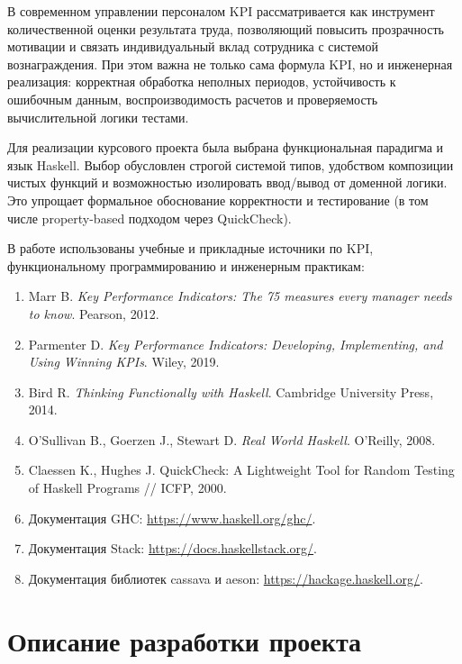 \documentclass[a4paper,14pt]{extarticle}
\begin{document}
В современном управлении персоналом KPI рассматривается как инструмент количественной оценки результата труда, позволяющий повысить прозрачность мотивации и связать индивидуальный вклад сотрудника с системой вознаграждения. При этом важна не только сама формула KPI, но и инженерная реализация: корректная обработка неполных периодов, устойчивость к ошибочным данным, воспроизводимость расчетов и проверяемость вычислительной логики тестами.

Для реализации курсового проекта была выбрана функциональная парадигма и язык Haskell. Выбор обусловлен строгой системой типов, удобством композиции чистых функций и возможностью изолировать ввод/вывод от доменной логики. Это упрощает формальное обоснование корректности и тестирование (в том числе property-based подходом через QuickCheck).

В работе использованы учебные и прикладные источники по KPI, функциональному программированию и инженерным практикам:
\begin{enumerate}
  \item Marr B. \textit{Key Performance Indicators: The 75 measures every manager needs to know}. Pearson, 2012.
  \item Parmenter D. \textit{Key Performance Indicators: Developing, Implementing, and Using Winning KPIs}. Wiley, 2019.
  \item Bird R. \textit{Thinking Functionally with Haskell}. Cambridge University Press, 2014.
  \item O'Sullivan B., Goerzen J., Stewart D. \textit{Real World Haskell}. O'Reilly, 2008.
  \item Claessen K., Hughes J. QuickCheck: A Lightweight Tool for Random Testing of Haskell Programs // ICFP, 2000.
  \item Документация GHC: \url{https://www.haskell.org/ghc/}.
  \item Документация Stack: \url{https://docs.haskellstack.org/}.
  \item Документация библиотек cassava и aeson: \url{https://hackage.haskell.org/}.
\end{enumerate}

\section{Описание разработки проекта}
\end{document}
